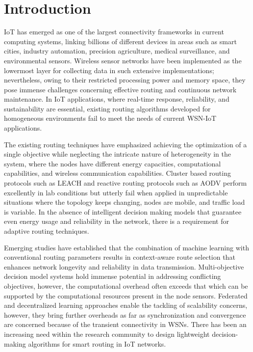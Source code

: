 \documentclass[a4paper,fleqn]{cas-dc}
\numberwithin{equation}{section}
\begin{document}
\section{Introduction}
\label{sec:intro}

IoT has emerged as one of the largest connectivity frameworks in current computing systems, linking billions of different devices in areas such as smart cities, industry automation, precision agriculture, medical surveillance, and environmental sensors.\cite{HaddadPajouh2019SurveyIoTSecurity,R24_AlHanif2023BriefSurveyIoT}
Wireless sensor networks have been implemented as the lowermost layer for collecting data in such extensive implementations; nevertheless, owing to their restricted processing power and memory space, they pose immense challenges concerning effective routing and continuous network maintenance.\cite{Laroui2021EdgeFogIoT}
In IoT applications, where real-time response, reliability, and sustainability are essential, existing routing algorithms developed for homogeneous environments fail to meet the needs of current WSN-IoT applications.

The existing routing techniques have emphasized achieving the
optimization of a single objective while neglecting the intricate
nature of heterogeneity in the system, where the nodes have different
energy capacities, computational capabilities, and wireless communication
capabilities.\cite{Tahsien2020MLIoTSecurity,R22_Tiwari2025ChallengesIoTDevices}
Cluster based routing protocols such as LEACH and
reactive routing protocols such as AODV perform excellently in lab
conditions but utterly fail when applied in unpredictable situations
where the topology keeps changing, nodes are mobile, and traffic load
is variable. In the absence of intelligent decision making models that
guarantee even energy usage and reliability in the network, there is a
requirement for adaptive routing techniques.\cite{R23_Mudholkar2024ChallengesIoTSecurity}

Emerging studies have established that the combination of machine learning with
conventional routing parameters results in context-aware route selection that enhances
network longevity and reliability in data transmission.\cite{R9_Tumula2025OptimizingIoTSDNBlockchain,R3_Narkedimilli2025AdaptiveCurriculumIoT}
Multi-objective decision model systems hold immense potential in addressing conflicting objectives,
however, the computational overhead often exceeds that which can be supported by the computational resources present in the node sensors.
Federated and decentralized learning approaches enable the tackling of scalability concerns, however, they bring further overheads as far as synchronization and convergence are concerned because of the transient connectivity in WSNs. \cite{R7_Baral2024AdaptiveEndToEndIoT} There has been an increasing need within the research community to design lightweight decision-making algorithms for smart routing in IoT networks.
\end{document}
